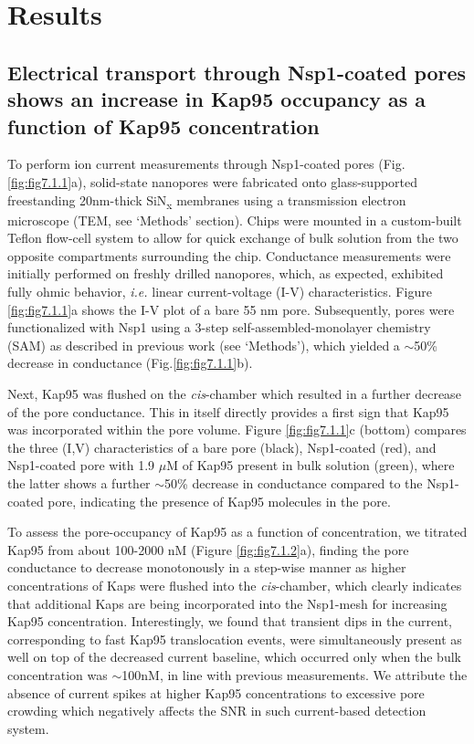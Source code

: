 \section{Results}
\subsection{Electrical transport through Nsp1-coated pores shows an increase in Kap95 occupancy as a function of Kap95 concentration}
To perform ion current measurements through Nsp1-coated pores (Fig.\ref{fig:fig7.1.1}a), solid-state nanopores were fabricated onto glass-supported freestanding 20nm-thick SiN\textsubscript{x} membranes using a transmission electron microscope (TEM, see ‘Methods’ section). Chips were mounted in a custom-built Teflon flow-cell system to allow for quick exchange of bulk solution from the two opposite compartments surrounding the chip. Conductance measurements were initially performed on freshly drilled nanopores, which, as expected, exhibited fully ohmic behavior, \emph{i.e.} linear current-voltage (I-V) characteristics. Figure \ref{fig:fig7.1.1}a shows the I-V plot of a bare 55 nm pore. Subsequently, pores were functionalized with Nsp1 using a 3-step self-assembled-monolayer chemistry (SAM) as described in previous work\cite{Fragasso2021} (see ‘Methods’), which yielded a $\sim$50\% decrease in conductance (Fig.\ref{fig:fig7.1.1}b). 

Next, Kap95 was flushed on the \emph{cis}-chamber which resulted in a further decrease of the pore conductance. This in itself directly provides a first sign that Kap95 was incorporated within the pore volume. Figure \ref{fig:fig7.1.1}c (bottom) compares the three (I,V) characteristics of a bare pore (black), Nsp1-coated (red), and Nsp1-coated pore with 1.9 $\mu$M of Kap95 present in bulk solution (green), where the latter shows a further $\sim$50\% decrease in conductance compared to the Nsp1-coated pore, indicating the presence of Kap95 molecules in the pore.


To assess the pore-occupancy of Kap95 as a function of concentration, we titrated Kap95 from about 100-2000 nM (Figure \ref{fig:fig7.1.2}a), finding the pore conductance to decrease monotonously in a step-wise manner as higher concentrations of Kaps were flushed into the \emph{cis}-chamber, which clearly indicates that additional Kaps are being incorporated into the Nsp1-mesh for increasing Kap95 concentration. Interestingly, we found that transient dips in the current, corresponding to fast Kap95 translocation events, were simultaneously present as well on top of the decreased current baseline, which occurred only when the bulk concentration was $\sim$100nM, in line with previous measurements\cite{Ananth2018}. We attribute the absence of current spikes at higher Kap95 concentrations to excessive pore crowding which negatively affects the SNR in such current-based detection system.

